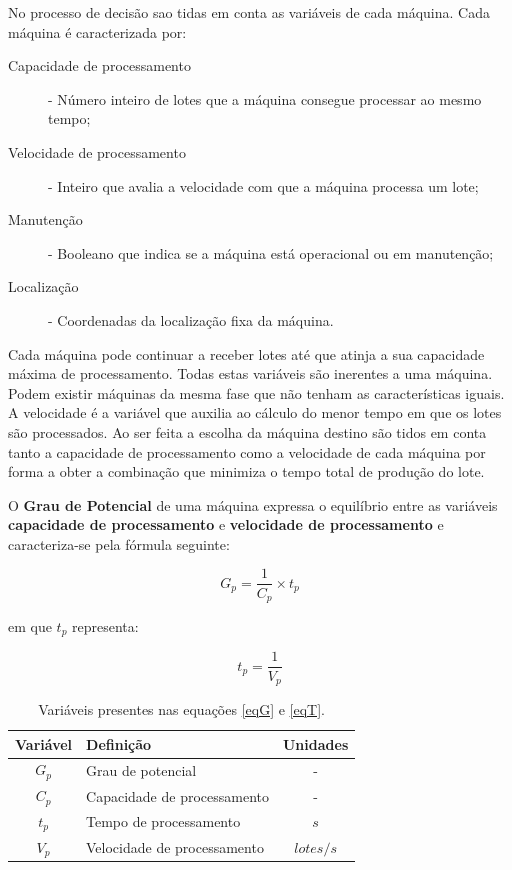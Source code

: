 \begin{titlepage}
No processo de decisão sao tidas em conta as variáveis de cada máquina. Cada máquina é caracterizada por:

\begin{description}
\item[Capacidade de processamento] -  Número inteiro de lotes que a máquina consegue processar ao mesmo tempo;
\item[Velocidade de processamento] - Inteiro que avalia a velocidade com que a máquina processa um lote;
\item[Manutenção] - Booleano que indica se a máquina está operacional ou em manutenção;
\item[Localização] - Coordenadas da localização fixa da máquina.
\end{description}

Cada máquina pode continuar a receber lotes até que atinja a sua capacidade máxima de processamento. Todas estas variáveis são inerentes a uma máquina. Podem existir máquinas da mesma fase que não tenham as características iguais. A velocidade é a variável que auxilia ao cálculo do menor tempo em que os lotes são processados. Ao ser feita a escolha da máquina destino são tidos em conta tanto a capacidade de processamento como a velocidade de cada máquina por forma a obter a combinação que minimiza o tempo total de produção do lote.


O \textbf{Grau de Potencial} de uma máquina expressa o equilíbrio entre as variáveis \textbf{capacidade de processamento} e \textbf{velocidade de processamento} e caracteriza-se pela fórmula seguinte:

\begin{equation}
G_{p}=\frac{1}{C_{p}}\times t_{p}
\label{eqG}
\end{equation}

em que $t_{p}$ representa: 

\begin{equation}
t_{p}=\frac{1}{V_{p}}
\label{eqT}
\end{equation}

\begin{table}[H]
\centering
\caption{Variáveis presentes nas equações \ref{eqG} e \ref{eqT}.}
\label{my-label}
\begin{tabular}{@{}p{2cm}ll@{}}
\toprule
\multicolumn{1}{c}{\textbf{Variável}} & \textbf{Definição}   & \multicolumn{1}{c}{\textbf{Unidades}} \\ \midrule
\multicolumn{1}{c}{$G_{p}$} & Grau de potencial &  \multicolumn{1}{c}{-}  \\ \midrule
\multicolumn{1}{c}{$C_{p}$} & Capacidade de processamento &  \multicolumn{1}{c}{-}  \\ \midrule
\multicolumn{1}{c}{$t_{p}$} & Tempo de processamento      & \multicolumn{1}{c}{$s$} \\ \midrule
\multicolumn{1}{c}{$V_{p}$} & Velocidade de processamento  & \multicolumn{1}{c}{$lotes/s$} \\ \bottomrule
\end{tabular}
\end{table}


\end{titlepage}
